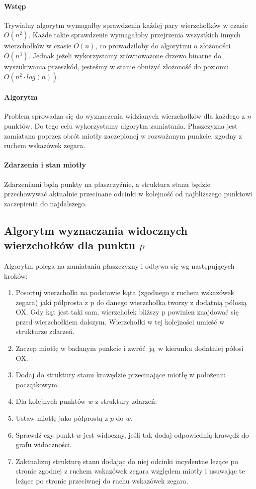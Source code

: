 \documentclass[12pt]{article}
\let\tempone\itemize
\let\temptwo\enditemize
\renewenvironment{itemize}{\tempone\setlength{\itemsep}{0cm}}{\temptwo}
\begin{document}
		\paragraph{Wstęp}
			Trywialny algorytm wymagałby sprawdzenia każdej pary wierzchołków w czasie $ O(n^2) $. Każde takie sprawdzenie wymagałoby przejrzenia wszystkich innych wierzchołków w czasie $ O(n) $, co prowadziłoby do algorytmu o złożoności $ O(n^3) $. Jednak jeżeli wykorzystamy zrównoważone drzewo binarne do wyszukiwania przeszkód, jesteśmy w stanie obniżyć złożoność do poziomu $ O(n^2 \cdot log(n)) $.
		
		\paragraph{Algorytm}
			Problem sprowadza się do wyznaczenia widzianych wierzchołków dla każdego z $ n $ punktów. Do tego celu wykorzystamy algorytm zamiatania. Płaszczyzna jest zamiatana poprzez obrót miotły zaczepionej w rozważanym punkcie, zgodny z ruchem wskazówek zegara.
			
		\paragraph{Zdarzenia i stan miotły}
		Zdarzeniami będą punkty na płaszczyźnie, a struktura stanu będzie przechowywać aktualnie przecinane odcinki w kolejność od najbliższego punktowi zaczepienia do najdalszego.
	
	\subsection{Algorytm wyznaczania widocznych wierzchołków dla punktu $ p $} \label{sssec:algo}
		Algorytm polega na zamiataniu płaszczyzny i odbywa się wg następujących kroków:
		\begin{enumerate}
			\item Posortuj wierzchołki na podstawie kąta (zgodnego z ruchem wskazówek zegara) jaki półprosta z p do danego wierzchołka tworzy z dodatnią półosią OX. Gdy kąt jest taki sam, wierzchołek bliższy p powinien znajdować się przed wierzchołkiem dalszym. Wierzchołki w tej kolejności umieść w strukturze zdarzeń.
			\item Zaczep miotłę w badanym punkcie i zwróć ją w kierunku dodatniej półosi OX.
			\item Dodaj do struktury stanu krawędzie przecinające miotłę w położeniu początkowym.
			\item Dla kolejnych punktów $ w $ z struktury zdarzeń:
			\begin{itemize}
				\item Ustaw miotłę jako półprostą z $ p $ do $ w $.
				\item Sprawdź czy punkt $ w $ jest widoczny, jeśli tak dodaj odpowiednią krawędź do grafu widoczności.
				\item Zaktualizuj strukturę stanu dodając do niej odcinki incydentne leżące po stronie zgodnej z ruchem wskazówek zegara względem miotły i usuwając te leżące po stronie przeciwnej do ruchu wskazówek zegara.
			\end{itemize}
		\end{enumerate}
	
\end{document}
